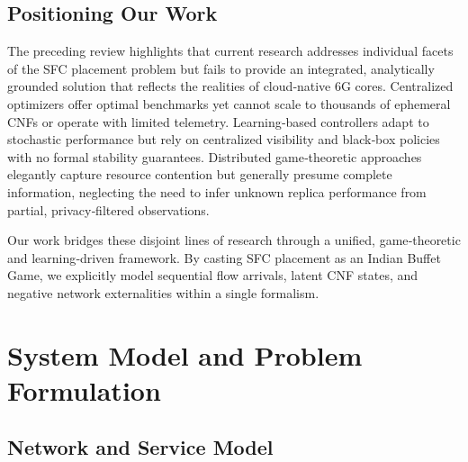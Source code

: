 \documentclass[journal]{IEEEtran}
\theoremstyle{plain}
\theoremstyle{definition}
\theoremstyle{remark}
\begin{document}
\subsection{Positioning Our Work}
\label{sec:related_positioning}

The preceding review highlights that current research addresses individual facets of the SFC placement problem but fails to provide an integrated, analytically grounded solution that reflects the realities of cloud‑native 6G cores. Centralized optimizers offer optimal benchmarks yet cannot scale to thousands of ephemeral CNFs or operate with limited telemetry. Learning‑based controllers adapt to stochastic performance but rely on centralized visibility and black‑box policies with no formal stability guarantees. Distributed game‑theoretic approaches elegantly capture resource contention but generally presume complete information, neglecting the need to infer unknown replica performance from partial, privacy‑filtered observations.  

Our work bridges these disjoint lines of research through a unified, game‑theoretic and learning‑driven framework. By casting SFC placement as an Indian Buffet Game, we explicitly model sequential flow arrivals, latent CNF states, and negative network externalities within a single formalism.

\section{System Model and Problem Formulation}
\label{sec:sys_model}

\subsection{Network and Service Model}
\label{sec:sys_network}
\end{document}
